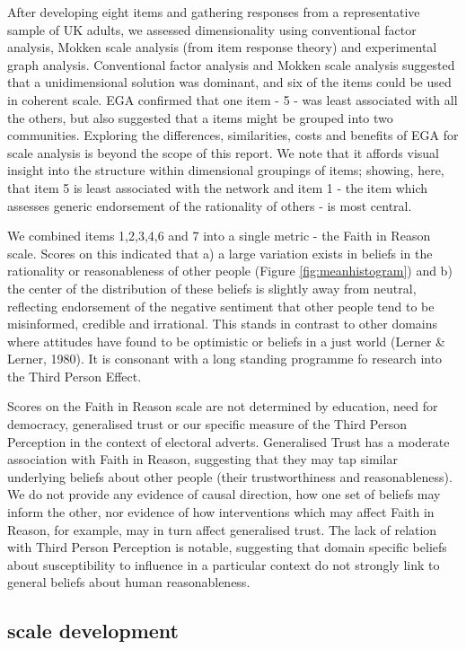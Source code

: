 \documentclass[
  ,jou,floatsintext]{apa6}
\begin{document}
After developing eight items and gathering responses from a representative sample of UK adults, we assessed dimensionality using conventional factor analysis, Mokken scale analysis (from item response theory) and experimental graph analysis. Conventional factor analysis and Mokken scale analysis suggested that a unidimensional solution was dominant, and six of the items could be used in coherent scale. EGA confirmed that one item - 5 - was least associated with all the others, but also suggested that a items might be grouped into two communities. Exploring the differences, similarities, costs and benefits of EGA for scale analysis is beyond the scope of this report. We note that it affords visual insight into the structure within dimensional groupings of items; showing, here, that item 5 is least associated with the network and item 1 - the item which assesses generic endorsement of the rationality of others - is most central.

We combined items 1,2,3,4,6 and 7 into a single metric - the Faith in Reason scale. Scores on this indicated that a) a large variation exists in beliefs in the rationality or reasonableness of other people (Figure \ref{fig:meanhistogram}) and b) the center of the distribution of these beliefs is slightly away from neutral, reflecting endorsement of the negative sentiment that other people tend to be misinformed, credible and irrational. This stands in contrast to other domains where attitudes have found to be optimistic or beliefs in a just world (Lerner \& Lerner, 1980). It is consonant with a long standing programme fo research into the Third Person Effect.

Scores on the Faith in Reason scale are not determined by education, need for democracy, generalised trust or our specific measure of the Third Person Perception in the context of electoral adverts. Generalised Trust has a moderate association with Faith in Reason, suggesting that they may tap similar underlying beliefs about other people (their trustworthiness and reasonableness). We do not provide any evidence of causal direction, how one set of beliefs may inform the other, nor evidence of how interventions which may affect Faith in Reason, for example, may in turn affect generalised trust. The lack of relation with Third Person Perception is notable, suggesting that domain specific beliefs about susceptibility to influence in a particular context do not strongly link to general beliefs about human reasonableness.

\hypertarget{scale-development}{%
\subsection{scale development}\label{scale-development}}
\end{document}
